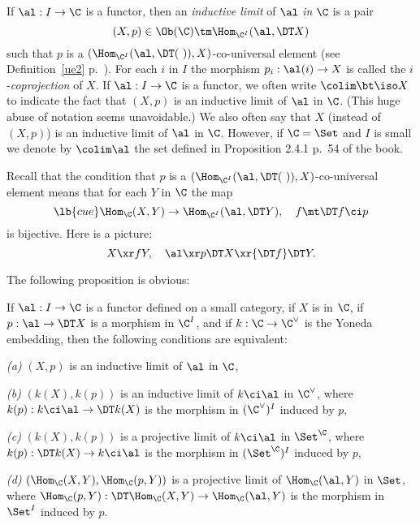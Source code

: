 \documentclass[12pt]{article}
\theoremstyle{remark}
\theoremstyle{definition}
\begin{document}
\begin{df}
If $\al:I\to\C$ is a functor, then an {\em inductive limit} of $\al$ {\em in} $\C$ is a pair 
$$
(X,p)\in\Ob(\C)\tm\Hom_{\C^I}(\al,\DT X)
$$
such that $p$ is a $(\Hom_{\C^I}(\al,\DT(\ )),X)$\--co-universal element (see Definition~\ref{ue2} p.~). For each $i$ in $I$ the morphism $p_i:\al(i)\to X$ is called the $i$-{\em coprojection} of $X$. %
If $\al:I\to\C$ is a functor, we often write $\colim\bt\iso X$ to indicate the fact that $(X,p)$ is an inductive limit of $\al$ in $\C$. (This huge abuse of notation seems unavoidable.) We also often say that $X$ (instead of $(X,p)$) is an inductive limit of $\al$ in $\C$. However, if $\C=\Set$ and $I$ is small we denote by $\colim\al$ the set defined in Proposition 2.4.1 p.~54 of the book.
\end{df}

Recall that the condition that $p$ is a $(\Hom_{\C^I}(\al,\DT(\ )),X)$\--co-universal element means that for each $Y$ in $\C$ the map 
\begin{equation}\lb{cue}
\Hom_\C(X,Y)\to\Hom_{\C^I}(\al,\DT Y),\quad f\mt\DT f\ci p
\end{equation}
is bijective. Here is a picture:
$$
X\xr fY,\quad\al\xr p\DT X\xr{\DT f}\DT Y.
$$

The following proposition is obvious:
\begin{prop}
If $\al:I\to\C$ is a functor defined on a small category, if $X$ is in $\C$, if $p:\al\to\DT X$ is a morphism in $\C^I$, and if $k:\C\to\C^\vee$ is the Yoneda embedding, then the following conditions are equivalent:

\nn\emph{(a)} $(X,p)$ is an inductive limit of $\al$ in $\C$,

\nn\emph{(b)} $(k(X),k(p))$ is an inductive limit of $k\ci\al$ in $\C^\vee$, where $k(p):k\ci\al\to\DT k(X)$ is the morphism in $(\C^\vee)^I$ induced by $p$,

\nn\emph{(c)} $(k(X),k(p))$ is a projective limit of $k\ci\al$ in $\Set^\C$, where $k(p):\DT k(X)\to k\ci\al$ is the morphism in $(\Set^\C)^I$ induced by $p$,

\nn\emph{(d)} $(\Hom_\C(X,Y),\Hom_\C(p,Y))$ is a projective limit of $\Hom_\C(\al,Y)$ in $\Set$, where $\Hom_\C(p,Y):\DT\Hom_\C(X,Y)\to\Hom_\C(\al,Y)$ is the morphism in $\Set^I$ induced by $p$.
\end{prop}
\end{document}
